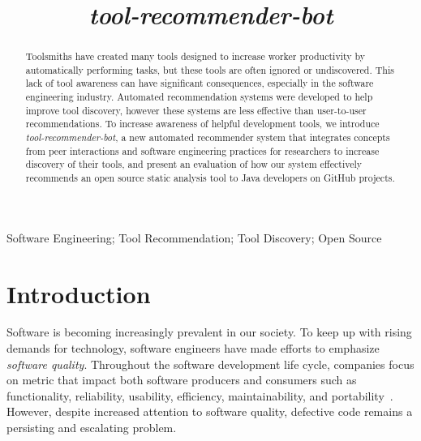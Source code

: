 \documentclass[conference]{IEEEtran}
\newcommand{\tool}{\textsl{tool-recommender-bot}}
\begin{document}

\title{\tool}

\author{
}

\maketitle
\begin{abstract}
Toolsmiths have created many tools designed to increase worker productivity by automatically performing tasks, but these tools are often ignored or undiscovered. This lack of tool awareness can have significant consequences, especially in the software engineering industry. Automated recommendation systems were developed to help improve tool discovery, however these systems are less effective than user-to-user recommendations. To increase awareness of helpful development tools, we introduce \textit{\tool}, a new automated recommender system that integrates concepts from peer interactions and software engineering practices for researchers to increase discovery of their tools, and present an evaluation of how our system effectively recommends an open source static analysis tool to Java developers on GitHub projects.
\end{abstract}

\begin{IEEEkeywords}
Software Engineering; Tool Recommendation; Tool Discovery; Open Source
\end{IEEEkeywords}

\section{Introduction}

Software is becoming increasingly prevalent in our society. To keep up with rising demands for technology, software engineers have made efforts to emphasize \textit{software quality}. Throughout the software development life cycle, companies focus on metric that impact both software producers and consumers such as functionality, reliability, usability, efficiency, maintainability, and portability~\cite{KitchenhamQualityTarget}. However, despite increased attention to software quality, defective code remains a persisting and escalating problem. 
\end{document}
